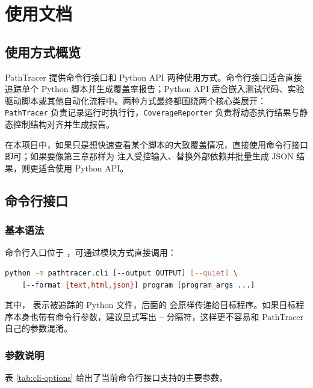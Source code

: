 
\chapter{使用文档}
\label{chap:usage}

\section{使用方式概览}

PathTracer 提供命令行接口和 Python API 两种使用方式。命令行接口适合直接追踪单个 Python 脚本并生成覆盖率报告；Python API 适合嵌入测试代码、实验驱动脚本或其他自动化流程中。两种方式最终都围绕两个核心类展开：\texttt{PathTracer} 负责记录运行时执行行，\texttt{CoverageReporter} 负责将动态执行结果与静态控制结构对齐并生成报告。

在本项目中，如果只是想快速查看某个脚本的大致覆盖情况，直接使用命令行接口即可；如果要像第三章那样为  注入受控输入、替换外部依赖并批量生成 JSON 结果，则更适合使用 Python API。

\section{命令行接口}

\subsection{基本语法}

命令行入口位于 ，可通过模块方式直接调用：

\begin{lstlisting}[language=bash, caption={PathTracer 命令行基本语法}]
python -m pathtracer.cli [--output OUTPUT] [--quiet] \
    [--format {text,html,json}] program [program_args ...]
\end{lstlisting}

其中， 表示被追踪的 Python 文件，后面的  会原样传递给目标程序。如果目标程序本身也带有命令行参数，建议显式写出 \texttt{--} 分隔符，这样更不容易和 PathTracer 自己的参数混淆。

\subsection{参数说明}

表 \ref{tab:cli-options} 给出了当前命令行接口支持的主要参数。

